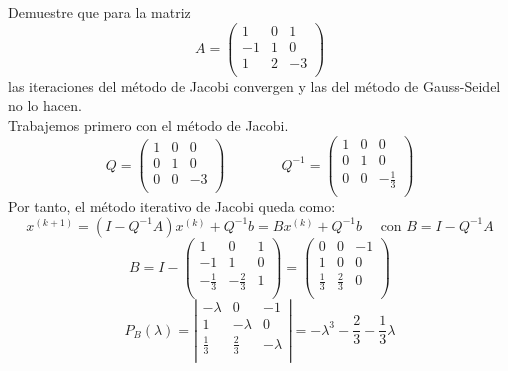 \begin{ejercicio}
    Demuestre que para la matriz
    $$A=\left( \begin{array}{ccc}
        1 & 0 & 1 \\
        -1 & 1 & 0 \\
        1 & 2 & -3 \\
    \end{array} \right)$$
    las iteraciones del método de Jacobi convergen y las del método de Gauss-Seidel no lo hacen.\\

    Trabajemos primero con el método de Jacobi.
    $$Q=\left( \begin{array}{ccc}
        1 & 0 & 0 \\
        0 & 1 & 0 \\
        0 & 0 & -3 \\
    \end{array} \right)
    \qquad \qquad
    Q^{-1}=\left( \begin{array}{ccc}
        1 & 0 & 0 \\
        0 & 1 & 0 \\
        0 & 0 & -\frac{1}{3} \\
    \end{array} \right)
    $$
    Por tanto, el método iterativo de Jacobi queda como:
    $$x^{(k+1)} = (I-Q^{-1}A)x^{(k)} + Q^{-1}b 
    =Bx^{(k)} + Q^{-1}b
    \quad \text{ con } B=I-Q^{-1}A$$
    $$B=I-\left( \begin{array}{ccc}
        1 & 0 & 1 \\
        -1 & 1 & 0 \\
        -\frac{1}{3} & -\frac{2}{3} & 1 \\
    \end{array} \right)
    = \left( \begin{array}{ccc}
        0 & 0 & -1 \\
        1 & 0 & 0 \\
        \frac{1}{3} & \frac{2}{3} & 0 \\
    \end{array} \right)$$
    $$P_B(\lambda)=\left|\begin{array}{ccc}
        -\lambda & 0 & -1 \\
        1 & -\lambda & 0 \\
        \frac{1}{3} & \frac{2}{3} & -\lambda \\
    \end{array} \right|= -\lambda^3 -\frac{2}{3} - \frac{1}{3}\lambda$$


\end{ejercicio}
